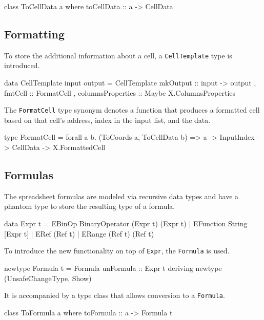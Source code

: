 \begin{mycode}
class ToCellData a where
  toCellData :: a -> CellData
\end{mycode}

\subsection{Formatting}
\label{sec:formatting}

To store the additional information about a cell, a \texttt{CellTemplate} type is introduced.

\begin{mycode}
data CellTemplate input output = CellTemplate
  { mkOutput :: input -> output
  , fmtCell :: FormatCell
  , columnsProperties :: Maybe X.ColumnsProperties
  }
\end{mycode}

The \texttt{FormatCell} type synonym denotes a function that produces a formatted cell based on that cell's address, index in the input list, and the data.

\begin{mycode}
type FormatCell = 
  forall a b. (ToCoords a, ToCellData b) => 
    a -> InputIndex -> CellData -> X.FormattedCell
\end{mycode}

\subsection{Formulas}
\label{sec:formulas}

The spreadsheet formulas are modeled via recursive data types and have a phantom type to store the resulting type of a formula.

\begin{mycode}
data Expr t
  = EBinOp BinaryOperator (Expr t) (Expr t)
  | EFunction String [Expr t]
  | ERef (Ref t)
  | ERange (Ref t) (Ref t)
\end{mycode}

To introduce the new functionality on top of \texttt{Expr}, the \texttt{Formula} is used.

\begin{mycode}
newtype Formula t = Formula {unFormula :: Expr t}
  deriving newtype (UnsafeChangeType, Show)
\end{mycode}

It is accompanied by a type class that allows conversion to a \texttt{Formula}.

\begin{mycode}
class ToFormula a where
  toFormula :: a -> Formula t
\end{mycode}


